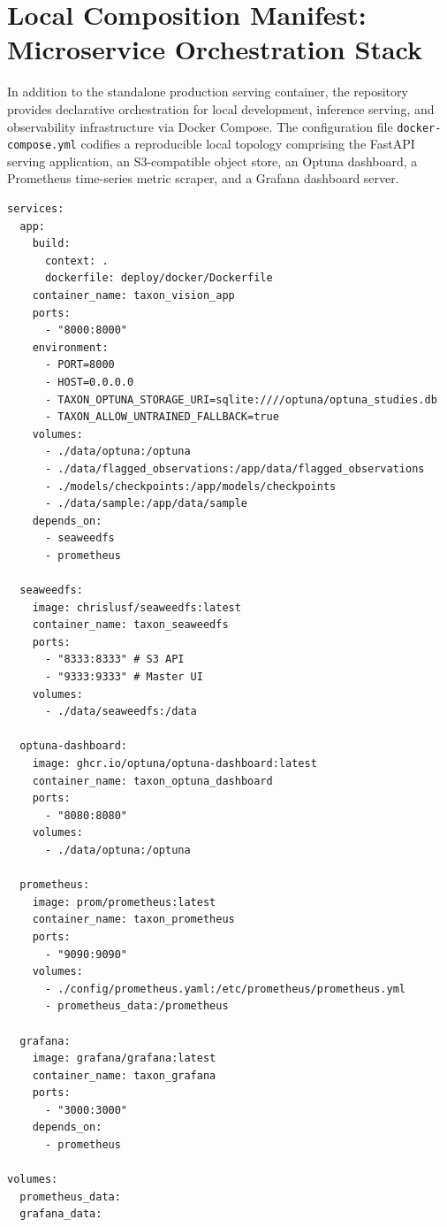 \section{Local Composition Manifest: Microservice Orchestration Stack}
\label{sec:local_composition_manifest}

In addition to the standalone production serving container, the repository provides declarative orchestration for local development, inference serving, and observability infrastructure via Docker Compose. The configuration file \texttt{docker-compose.yml} codifies a reproducible local topology comprising the FastAPI serving application, an S3-compatible object store, an Optuna dashboard, a Prometheus time-series metric scraper, and a Grafana dashboard server.

\begin{listing}[htbp]
\begin{verbatim}
services:
  app:
    build:
      context: .
      dockerfile: deploy/docker/Dockerfile
    container_name: taxon_vision_app
    ports:
      - "8000:8000"
    environment:
      - PORT=8000
      - HOST=0.0.0.0
      - TAXON_OPTUNA_STORAGE_URI=sqlite:////optuna/optuna_studies.db
      - TAXON_ALLOW_UNTRAINED_FALLBACK=true
    volumes:
      - ./data/optuna:/optuna
      - ./data/flagged_observations:/app/data/flagged_observations
      - ./models/checkpoints:/app/models/checkpoints
      - ./data/sample:/app/data/sample
    depends_on:
      - seaweedfs
      - prometheus

  seaweedfs:
    image: chrislusf/seaweedfs:latest
    container_name: taxon_seaweedfs
    ports:
      - "8333:8333" # S3 API
      - "9333:9333" # Master UI
    volumes:
      - ./data/seaweedfs:/data

  optuna-dashboard:
    image: ghcr.io/optuna/optuna-dashboard:latest
    container_name: taxon_optuna_dashboard
    ports:
      - "8080:8080"
    volumes:
      - ./data/optuna:/optuna

  prometheus:
    image: prom/prometheus:latest
    container_name: taxon_prometheus
    ports:
      - "9090:9090"
    volumes:
      - ./config/prometheus.yaml:/etc/prometheus/prometheus.yml
      - prometheus_data:/prometheus

  grafana:
    image: grafana/grafana:latest
    container_name: taxon_grafana
    ports:
      - "3000:3000"
    depends_on:
      - prometheus

volumes:
  prometheus_data:
  grafana_data:
\end{verbatim}
\caption{Docker Compose manifest (\texttt{docker-compose.yml}) defining local FastAPI, SeaweedFS, Optuna Dashboard, Prometheus, and Grafana microservices.}
\label{lst:docker_compose_local}
\end{listing}


